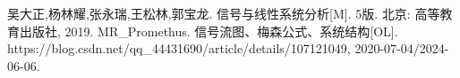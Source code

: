 \begin{thebibliography}{99}%
     吴大正,杨林耀,张永瑞,王松林,郭宝龙. 信号与线性系统分析[M]. 5版. 北京: 高等教育出版社, 2019.
     MR\_Promethus. 信号流图、梅森公式、系统结构[OL]. https://blog.csdn.net/qq\_44431690/article/details/107121049, 2020-07-04/2024-06-06. 
\end{thebibliography}
